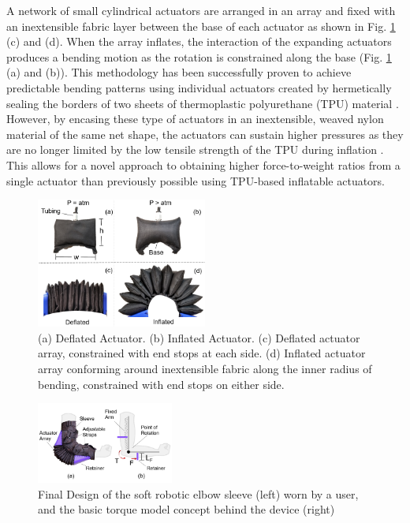 \documentclass[letterpaper, 10 pt, conference]{ieeeconf}  %
\begin{document}
A network of small cylindrical actuators are arranged in an array and fixed with an inextensible fabric layer between the base of each actuator as shown in Fig. \ref{fig:array} (c) and (d).  When the array inflates, the interaction of the expanding actuators produces a bending motion as the rotation is constrained along the base (Fig. \ref{fig:array} (a) and (b)).  This methodology has been successfully proven to achieve predictable bending patterns using  individual actuators created by hermetically sealing the borders of two sheets of thermoplastic polyurethane (TPU) material \cite{mosadegh2014pneumatic}\cite{ADEM:ADEM201700016}\cite{natividad2017h} \cite{Koh2017}.    However, by encasing these type of actuators in an inextensible, weaved nylon material of the same net shape, the actuators can sustain higher pressures as they are no longer limited by the low tensile strength of the TPU during inflation .  This allows for a novel approach to obtaining higher force-to-weight ratios from a single actuator than previously possible using TPU-based inflatable actuators.  
\begin{figure}[t]
\centering
\includegraphics[width=0.5\textwidth]{V1_device.PNG}
\caption{(a) Deflated Actuator. (b) Inflated Actuator. (c) Deflated actuator array, constrained with end stops at each side. (d) Inflated actuator array conforming around inextensible fabric along the inner radius of bending, constrained with end stops on either side.
}
\vspace{-1.5em}
\label{fig:array}
\end{figure}

\begin{figure}
\centering
\includegraphics[width=0.4\textwidth]{arm.PNG}
\caption{Final Design of the soft robotic elbow sleeve (left) worn by a user, and the basic torque model concept behind the device (right)}
\label{fig:arm}
\vspace{-1.5em}
\end{figure}
 
\end{document}
